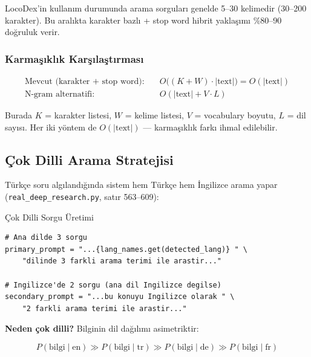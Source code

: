 LocoDex'in kullan{\i}m durumunda arama sorgular{\i} genelde 5--30 kelimedir (30--200 karakter). Bu aral{\i}kta karakter bazl{\i} + stop word hibrit yakla\c{s}{\i}m{\i} \%80--90 do\u{g}ruluk verir.

\subsubsection{Karma\c{s}{\i}kl{\i}k Kar\c{s}{\i}la\c{s}t{\i}rmas{\i}}

\begin{align}
\text{Mevcut (karakter + stop word):} &\quad O\bigl((K + W) \cdot |\text{text}|\bigr) = O(|\text{text}|) \\
\text{N-gram alternatifi:} &\quad O(|\text{text}| + V \cdot L)
\end{align}

Burada $K$ = karakter listesi, $W$ = kelime listesi, $V$ = vocabulary boyutu, $L$ = dil say{\i}s{\i}. Her iki y\"{o}ntem de $O(|\text{text}|)$ --- karma\c{s}{\i}kl{\i}k fark{\i} ihmal edilebilir.

\subsection{\c{C}ok Dilli Arama Stratejisi}

T\"{u}rk\c{c}e soru alg{\i}land{\i}\u{g}{\i}nda sistem hem T\"{u}rk\c{c}e hem \.{I}ngilizce arama yapar (\texttt{real\_deep\_research.py}, sat{\i}r 563--609):

\begin{kodref}{\c{C}ok Dilli Sorgu \"{U}retimi}
\begin{lstlisting}
# Ana dilde 3 sorgu
primary_prompt = "...{lang_names.get(detected_lang)} " \
    "dilinde 3 farkli arama terimi ile arastir..."

# Ingilizce'de 2 sorgu (ana dil Ingilizce degilse)
secondary_prompt = "...bu konuyu Ingilizce olarak " \
    "2 farkli arama terimi ile arastir..."
\end{lstlisting}
\end{kodref}

\textbf{Neden \c{c}ok dilli?} Bilginin dil da\u{g}{\i}l{\i}m{\i} asimetriktir:

\begin{equation}
\label{eq:info-asymmetry}
P(\text{bilgi} \mid \text{en}) \gg P(\text{bilgi} \mid \text{tr}) \gg P(\text{bilgi} \mid \text{de}) \gg P(\text{bilgi} \mid \text{fr})
\end{equation}

